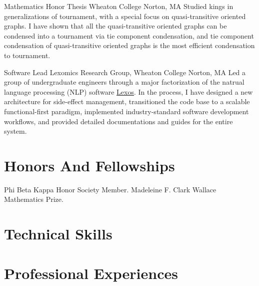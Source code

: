\documentclass[11pt,roman]{moderncv}        %
\begin{document}
{Mathematics Honor Thesis}
{Wheaton College} {Norton, MA}{}
{Studied kings in generalizations of tournament,
with a special focus on quasi-transitive oriented graphs.
I have shown that all the quasi-transitive oriented graphs
can be condensed into a tournament via tie component condensation, 
and tie component condensation of quasi-transitive 
oriented graphs is the most efficient condensation to tournament.
}

{Software Lead}
{Lexomics Research Group, Wheaton College}
{Norton, MA}{}
{
  Led a group of undergraduate engineers through a major factorization of 
  the natrual language processing (NLP) software 
  \href{https://github.com/WheatonCS/Lexos}{Lexos}.
  In the process, 
  I have designed a new architecture for side-effect management,
  transitioned the code base to a scalable functional-first paradigm,
  implemented industry-standard software development workflows,
  and provided detailed documentations and guides for the entire system.
}


\section{Honors And Fellowships}
 {Phi Beta Kappa Honor Society Member.}
 {Madeleine F. Clark Wallace Mathematics Prize.}


\section{Technical Skills}


\section{Professional Experiences}
\end{document}
